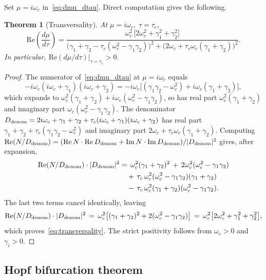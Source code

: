 \documentclass[sn-mathphys,Numbered]{sn-jnl}
\theoremstyle{thmstyleone}
\newtheorem{theorem}{Theorem}
\theoremstyle{thmstyletwo}
\theoremstyle{thmstylethree}
\begin{document}
Set $\mu=i\omega_c$ in~\eqref{eq:dmu_dtau}. Direct computation gives the
following.
\begin{theorem}[Transversality]
\label{thm:transversality}
At $\mu=i\omega_c,\;\tau=\tau_c$,
\begin{equation}
\mathrm{Re}\!\left(\frac{d\mu}{d\tau}\right)
= \frac{\omega_c^2\,\bigl[2\omega_c^2+\gamma_1^2+\gamma_2^2\bigr]}
       {\bigl(\gamma_1+\gamma_2-\tau_c(\omega_c^2-\gamma_1\gamma_2)\bigr)^2
        +\bigl(2\omega_c+\tau_c\omega_c(\gamma_1+\gamma_2)\bigr)^2}.
\label{eq:transversality}
\end{equation}
In particular, $\mathrm{Re}(d\mu/d\tau)|_{\tau=\tau_c}>0$.
\end{theorem}
\begin{proof}
The numerator of~\eqref{eq:dmu_dtau} at $\mu=i\omega_c$ equals
\[
-i\omega_c(i\omega_c+\gamma_1)(i\omega_c+\gamma_2)
= -i\omega_c\bigl[(\gamma_1\gamma_2-\omega_c^2) +
                  i\omega_c(\gamma_1+\gamma_2)\bigr],
\]
which expands to
$\omega_c^2(\gamma_1+\gamma_2) + i\omega_c(\omega_c^2-\gamma_1\gamma_2)$,
so has real part $\omega_c^2(\gamma_1+\gamma_2)$ and imaginary part
$\omega_c(\omega_c^2-\gamma_1\gamma_2)$. The denominator
$D_{\rm denom} = 2i\omega_c+\gamma_1+\gamma_2 +
\tau_c(i\omega_c+\gamma_1)(i\omega_c+\gamma_2)$ has real part
$\gamma_1+\gamma_2 + \tau_c(\gamma_1\gamma_2-\omega_c^2)$ and
imaginary part $2\omega_c + \tau_c\omega_c(\gamma_1+\gamma_2)$.
Computing
$\mathrm{Re}(N/D_{\rm denom}) = (\mathrm{Re}\,N\cdot\mathrm{Re}\,D_{\rm denom}
+\mathrm{Im}\,N\cdot\mathrm{Im}\,D_{\rm denom})/|D_{\rm denom}|^2$
gives, after expansion,
\begin{align*}
\mathrm{Re}(N/D_{\rm denom})\cdot|D_{\rm denom}|^2
&=\, \omega_c^2(\gamma_1+\gamma_2)^2
\,+\, 2\omega_c^2(\omega_c^2-\gamma_1\gamma_2)\\
&\quad +\,\tau_c\,\omega_c^2(\omega_c^2-\gamma_1\gamma_2)(\gamma_1+\gamma_2)\\
&\quad -\,\tau_c\,\omega_c^2(\gamma_1+\gamma_2)(\omega_c^2-\gamma_1\gamma_2).
\end{align*}
The last two terms cancel identically, leaving
\[
\mathrm{Re}(N/D_{\rm denom})\cdot|D_{\rm denom}|^2
\,=\, \omega_c^2\bigl[(\gamma_1+\gamma_2)^2+2(\omega_c^2-\gamma_1\gamma_2)\bigr]
\,=\, \omega_c^2\bigl[2\omega_c^2+\gamma_1^2+\gamma_2^2\bigr],
\]
which proves~\eqref{eq:transversality}. The strict positivity follows from
$\omega_c>0$ and $\gamma_i>0$.
\end{proof}

\subsection{Hopf bifurcation theorem}
\end{document}
